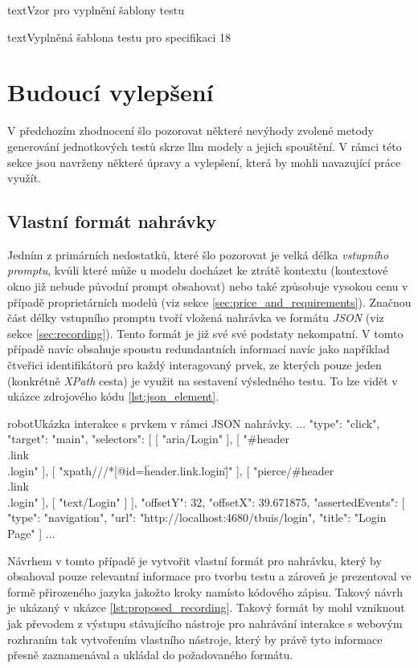 \documentclass[czech, ma, kiv, he, iso690numb, pdf, viewonly]{fasthesis}
\begin{document}
\begin{code}{text}{Vzor pro vyplnění šablony testu \label{lst:template}}
{\begin{code}{text}{Vyplněná šablona testu pro specifikaci 18 \label{lst:spec18}}
{\chapter{Budoucí vylepšení} \label{sec:future_work}

    V předchozím zhodnocení šlo pozorovat některé nevýhody zvolené metody generování jednotkových testů skrze \Gls{llm} modely a jejich spouštění. V rámci této sekce jsou navrženy některé úpravy a vylepšení, která by mohli navazující práce využít.

    \section{Vlastní formát nahrávky}

    Jedním z primárních nedostatků, které šlo pozorovat je velká délka \textit{vstupního promptu}, kvůli které může u modelu docházet ke ztrátě kontextu (kontextové okno již nebude původní prompt obsahovat) nebo také způsobuje vysokou cenu v případě proprietárních modelů (viz sekce \ref{sec:price_and_requirements}). Značnou část délky vstupního promptu tvoří vložená nahrávka ve formátu \textit{JSON} (viz sekce \ref{sec:recording}). Tento formát je již své své podstaty nekompatní. V tomto případě navíc obsahuje spoustu redundantních informací navíc jako například čtveřici identifikátorů pro každý interagovaný prvek, ze kterých pouze jeden (konkrétně \textit{XPath} cesta) je využit na  sestavení výsledného testu. To lze vidět v ukázce zdrojového kódu \ref{lst:json_element}.

    \begin{code}{robot}{Ukázka interakce s prvkem v rámci JSON nahrávky. \label{lst:json_element}}
...
{
    "type": "click",
    "target": "main",
    "selectors": [
        [
            "aria/Login"
        ],
        [
            "#header\\.link\\.login"
        ],
        [
            "xpath///*[@id=\"header.link.login\"]"
        ],
        [
            "pierce/#header\\.link\\.login"
        ],
        [
            "text/Login"
        ]
    ],
    "offsetY": 32,
    "offsetX": 39.671875,
    "assertedEvents": [
        {
            "type": "navigation",
            "url": "http://localhost:4680/tbuis/login",
            "title": "Login Page"
        }
    ]
}
...  \end{code}

    Návrhem v tomto případě je vytvořit vlastní formát pro nahrávku, který by obsahoval pouze relevantní informace pro tvorbu testu a zároveň je prezentoval ve formě přirozeného jazyka jakožto kroky namísto kódového zápisu. Takový návrh je ukázaný v ukázce \ref{lst:proposed_recording}. Takový formát by mohl vzniknout jak převodem z výstupu stávajícího nástroje pro nahrávání interakce s webovým rozhraním tak vytvořením vlastního nástroje, který by právě tyto informace přesně zaznamenával a ukládal do požadovaného formátu.

}
\end{code}}
\end{code}
\end{document}

